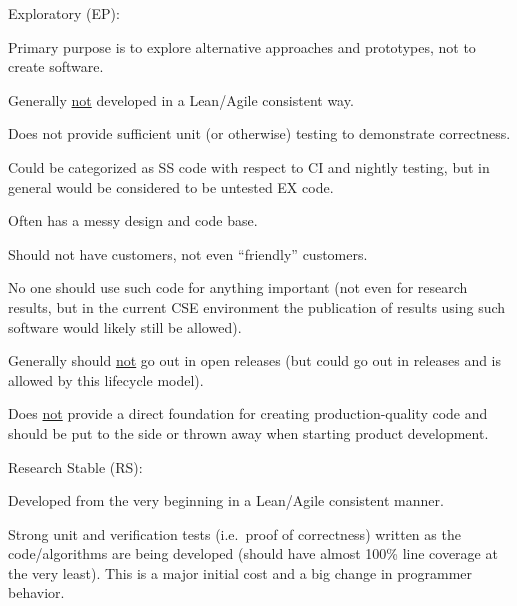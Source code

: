 \documentclass[11pt]{SANDreport}
\begin{document}
\begin{compactenum}

{}\item Exploratory (EP):

\begin{compactitem}

{}\item Primary purpose is to explore alternative approaches and
prototypes, not to create software.

{}\item Generally {}\underline{not} developed in a Lean/Agile
consistent way.

{}\item Does not provide sufficient unit (or otherwise) testing to
demonstrate correctness.

{}\item Could be categorized as SS code with respect to CI
and nightly testing, but in general would be considered to be untested
EX code.

{}\item Often has a messy design and code base.

{}\item Should not have  customers, not even ``friendly'' customers.

{}\item No one should use such code for anything important (not even
for research results, but in the current CSE environment the
publication of results using such software would likely still be
allowed).

{}\item Generally should {}\underline{not} go out in open releases
(but could go out in releases and is allowed by this lifecycle model).

{}\item Does {}\underline{not} provide a direct foundation for
creating production-quality code and should be put to the side or
thrown away when starting product development.

\end{compactitem}

{}\item Research Stable (RS):

\begin{compactitem}

{}\item Developed from the very beginning in a Lean/Agile consistent
manner.

{}\item Strong unit and verification tests (i.e.\ proof of
correctness) written as the code/algorithms are being developed
(should have almost 100\% line coverage at the very least).  This is a
major initial cost and a big change in programmer behavior.


\end{compactitem}
\end{compactenum}
\end{document}
